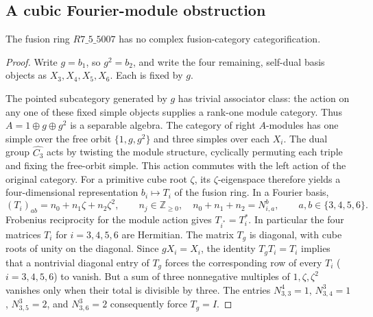 \subsection{A cubic Fourier-module obstruction}
\begin{proposition}\label{prop:cubic-Fourier-module}
The fusion ring $R7\_5\_5007$ has no complex fusion-category categorification.
\end{proposition}
\begin{proof}
Write $g=b_1$, so $g^2=b_2$, and write the four remaining,
self-dual basis objects as $X_3,X_4,X_5,X_6$. Each is fixed by $g$.

The pointed subcategory generated by $g$ has trivial associator class:
the action on any one of these fixed simple objects supplies a rank-one
module category. Thus $A=1\oplus g\oplus g^2$ is a separable algebra.
The category of right $A$-modules has one simple over the free orbit
$\{1,g,g^2\}$ and three simples over each $X_i$. The dual group
$\widehat{C_3}$ acts by twisting the module structure, cyclically permuting
each triple and fixing the free-orbit simple. This action commutes with
the left action of the original category. For a primitive cube root
$\zeta$, its $\zeta$-eigenspace therefore yields a four-dimensional
representation $b_i\mapsto T_i$ of the fusion ring. In a Fourier basis,
\[
 (T_i)_{ab}=n_0+n_1\zeta+n_2\zeta^2,
 \qquad n_j\in\mathbb Z_{\ge0},\quad
 n_0+n_1+n_2=N_{i,a}^{b}, \qquad a,b\in\{3,4,5,6\}.
\]
Frobenius reciprocity for the module action gives $T_{i^*}=T_i^*$.
In particular the four matrices $T_i$ for $i=3,4,5,6$ are Hermitian.
The matrix $T_g$ is diagonal, with cube roots of unity on the diagonal.
Since $gX_i=X_i$, the identity $T_gT_i=T_i$ implies that a nontrivial
diagonal entry of $T_g$ forces the corresponding row of every $T_i$
($i=3,4,5,6$) to vanish. But a sum of three nonnegative multiples of
$1,\zeta,\zeta^2$ vanishes only when their total is divisible by three.
The entries $N_{3,3}^{4}=1$, $N_{3,4}^{3}=1$,
$N_{3,5}^{3}=2$, and $N_{3,6}^{3}=2$ consequently force $T_g=I$.


\end{proof}
